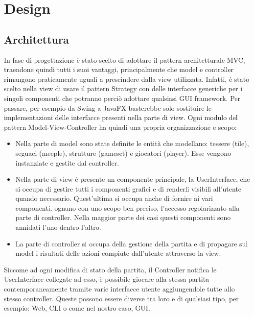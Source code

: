 \section{Design}
\subsection{Architettura}

In fase di progettazione è stato scelto di adottare il pattern architetturale MVC, traendone quindi tutti i suoi vantaggi, principalmente che model e controller rimangono praticamente uguali a prescindere dalla view utilizzata. Infatti, è stato scelto nella view di usare il pattern Strategy con delle interfacce generiche per i singoli componenti che potranno perciò adottare qualsiasi GUI framework. Per passare, per esempio da Swing a JavaFX basterebbe solo sostituire le implementazioni delle interfacce presenti nella parte di view. Ogni modulo del pattern Model-View-Controller ha quindi una propria organizzazione e scopo:
\begin{itemize}
    \item Nella parte di model sono state definite le entità che modellano: tessere (tile), seguaci (meeple), strutture (gameset) e giocatori (player). Esse vengono instanziate e gestite dal controller.
    \item Nella parte di view è presente un componente principale, la UserInterface, che si occupa di gestire tutti i componenti grafici e di renderli visibili all'utente quando necessario. Quest'ultima si occupa anche di fornire ai vari componenti, ognuno con uno scopo ben preciso, l'accesso regolarizzato alla parte di controller. Nella maggior parte dei casi questi componenti sono annidati l'uno dentro l'altro.
    \item La parte di controller si occupa della gestione della partita e di propagare sul model i risultati delle azioni compiute dall'utente attraverso la view.
\end{itemize}
Siccome ad ogni modifica di stato della partita, il Controller notifica le UserInterface collegate ad esso, è possibile giocare alla stessa partita contemporaneamente tramite varie interfacce utente aggiungendole tutte allo stesso controller. Queste possono essere diverse tra loro e di qualsiasi tipo, per esempio: Web, CLI o come nel nostro caso, GUI.


